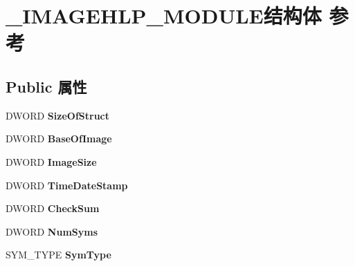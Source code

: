 \hypertarget{struct___i_m_a_g_e_h_l_p___m_o_d_u_l_e}{}\section{\+\_\+\+I\+M\+A\+G\+E\+H\+L\+P\+\_\+\+M\+O\+D\+U\+L\+E结构体 参考}
\label{struct___i_m_a_g_e_h_l_p___m_o_d_u_l_e}
\subsection*{Public 属性}
\begin{DoxyCompactItemize}
\item 
\mbox{\label{struct___i_m_a_g_e_h_l_p___m_o_d_u_l_e_a818ac6ff43636479c6cbb8524319f2c7}} 
D\+W\+O\+RD {\bfseries Size\+Of\+Struct}
\item 
\mbox{\label{struct___i_m_a_g_e_h_l_p___m_o_d_u_l_e_a2fcc6380a4623916d90ccaf2b219b7c1}} 
D\+W\+O\+RD {\bfseries Base\+Of\+Image}
\item 
\mbox{\label{struct___i_m_a_g_e_h_l_p___m_o_d_u_l_e_ac687ee9c1dceb7ecabaa8740d72387a6}} 
D\+W\+O\+RD {\bfseries Image\+Size}
\item 
\mbox{\label{struct___i_m_a_g_e_h_l_p___m_o_d_u_l_e_a2c561a2090b37e142b1064316c32e55b}} 
D\+W\+O\+RD {\bfseries Time\+Date\+Stamp}
\item 
\mbox{\label{struct___i_m_a_g_e_h_l_p___m_o_d_u_l_e_a728a49f30e1e710e22c4462f47ef0691}} 
D\+W\+O\+RD {\bfseries Check\+Sum}
\item 
\mbox{\label{struct___i_m_a_g_e_h_l_p___m_o_d_u_l_e_a249d76e9bd97189566e64a7b9d0d927b}} 
D\+W\+O\+RD {\bfseries Num\+Syms}
\item 
\mbox{\label{struct___i_m_a_g_e_h_l_p___m_o_d_u_l_e_a6c92bb447f2e57638c4438b421f68276}} 
S\+Y\+M\+\_\+\+T\+Y\+PE {\bfseries Sym\+Type}
\item 
\mbox{\label{struct___i_m_a_g_e_h_l_p___m_o_d_u_l_e_a87c3c11c0b8b9ca78bf188719e762406}} 

\end{DoxyCompactItemize}
